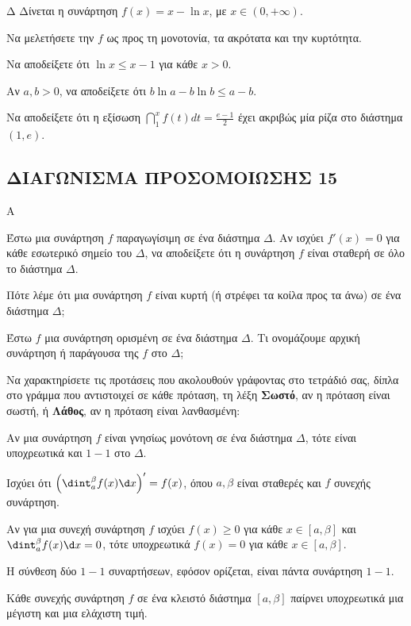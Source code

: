 \begin{thema}{Δ}
Δίνεται η συνάρτηση $f(x)=x-\ln x$, με $x \in (0,+\infty)$.
\begin{erwthma}
    \item Να μελετήσετε την $f$ ως προς τη μονοτονία, τα ακρότατα και την κυρτότητα. 
    \item Να αποδείξετε ότι $\ln x \leq x - 1$ για κάθε $x > 0$. 
    \item Αν $a, b > 0$, να αποδείξετε ότι $b\ln a - b\ln b \leq a - b$. 
    \item Να αποδείξετε ότι η εξίσωση $\dint_1^x f(t)dt = \frac{e-1}{2}$ έχει ακριβώς μία ρίζα στο διάστημα $(1, e)$. 
\end{erwthma}
\end{thema}

\newpage
\subsection{ΔΙΑΓΩΝΙΣΜΑ ΠΡΟΣΟΜΟΙΩΣΗΣ 15}
\begin{thema}{Α}
\begin{erwthma}
    \item Έστω μια συνάρτηση $f$ παραγωγίσιμη σε ένα διάστημα $\Delta$. Αν ισχύει $f'(x)=0$ για κάθε εσωτερικό σημείο του $\Delta$, να αποδείξετε ότι η συνάρτηση $f$ είναι σταθερή σε όλο το διάστημα $\Delta$. 
    \item Πότε λέμε ότι μια συνάρτηση $f$ είναι κυρτή (ή στρέφει τα κοίλα προς τα άνω) σε ένα διάστημα $\Delta$; 
    \item Έστω $f$ μια συνάρτηση ορισμένη σε ένα διάστημα $\Delta$. Τι ονομάζουμε αρχική συνάρτηση ή παράγουσα της $f$ στο $\Delta$; 
    \item Να χαρακτηρίσετε τις προτάσεις που ακολουθούν γράφοντας στο τετράδιό σας, δίπλα στο γράμμα που αντιστοιχεί σε κάθε πρόταση, τη λέξη \textbf{Σωστό},
αν η πρόταση είναι σωστή, ή \textbf{Λάθος}, αν η πρόταση είναι λανθασμένη:
    \begin{alist}
        \item Αν μια συνάρτηση $f$ είναι γνησίως μονότονη σε ένα διάστημα $\Delta$, τότε είναι υποχρεωτικά και $1-1$ στο $\Delta$.
        \item Ισχύει ότι $\left(\dint_a^\beta f(x)\d x\right)' = f(x)$, όπου $a,\beta$ είναι σταθερές και $f$ συνεχής συνάρτηση.
        \item Αν για μια συνεχή συνάρτηση $f$ ισχύει $f(x)\geq 0$ για κάθε $x \in [a,\beta]$ και $\dint_a^\beta f(x)\d x = 0$, τότε υποχρεωτικά $f(x)=0$ για κάθε $x \in [a,\beta]$.
        \item Η σύνθεση δύο $1-1$ συναρτήσεων, εφόσον ορίζεται, είναι πάντα συνάρτηση $1-1$.
        \item Κάθε συνεχής συνάρτηση $f$ σε ένα κλειστό διάστημα $[a,\beta]$ παίρνει υποχρεωτικά μια μέγιστη και μια ελάχιστη τιμή.
    \end{alist} 
\end{erwthma}
\end{thema}

